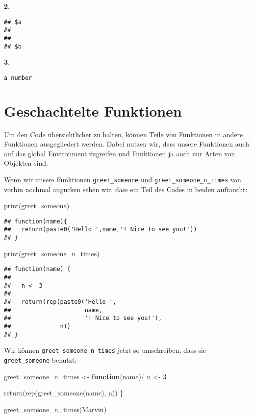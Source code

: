 \documentclass[
]{book}
\newenvironment{Shaded}{\begin{snugshade}}{\end{snugshade}}
\newcommand{\ControlFlowTok}[1]{\textcolor[rgb]{0.13,0.29,0.53}{\textbf{#1}}}
\newcommand{\DecValTok}[1]{\textcolor[rgb]{0.00,0.00,0.81}{#1}}
\newcommand{\FunctionTok}[1]{\textcolor[rgb]{0.00,0.00,0.00}{#1}}
\newcommand{\NormalTok}[1]{#1}
\newcommand{\OtherTok}[1]{\textcolor[rgb]{0.56,0.35,0.01}{#1}}
\newcommand{\StringTok}[1]{\textcolor[rgb]{0.31,0.60,0.02}{#1}}
\begin{document}
\textbf{2.}

\begin{verbatim}
## $a
## 
## 
## $b
\end{verbatim}

\textbf{3.}

\texttt{\textquotesingle{}a\ number\textquotesingle{}}

\hypertarget{geschachtelte-funktionen}{%
\section{Geschachtelte Funktionen}\label{geschachtelte-funktionen}}

Um den Code übersichtlicher zu halten, können Teile von Funktionen in andere Funktionen ausgegliedert werden.
Dabei nutzen wir, dass unsere Funktionen auch auf das global Environment zugreifen und Funktionen ja auch nur Arten von Objekten sind.

Wenn wir unsere Funktionen \texttt{greet\_someone} und \texttt{greet\_someone\_n\_times} von vorhin nochmal angucken sehen wir, dass ein Teil des Codes in beiden auftaucht:

\begin{Shaded}
\begin{Highlighting}[]
\FunctionTok{print}\NormalTok{(greet\_someone)}
\end{Highlighting}
\end{Shaded}

\begin{verbatim}
## function(name){
##   return(paste0('Hello ',name,'! Nice to see you!'))
## }
\end{verbatim}

\begin{Shaded}
\begin{Highlighting}[]
\FunctionTok{print}\NormalTok{(greet\_someone\_n\_times)}
\end{Highlighting}
\end{Shaded}

\begin{verbatim}
## function(name) {
##   
##   n <- 3
##   
##   return(rep(paste0('Hello ', 
##                     name, 
##                     '! Nice to see you!'), 
##              n))
## }
\end{verbatim}

Wir können \texttt{greet\_someone\_n\_times} jetzt so umschreiben, dass sie \texttt{greet\_someone} benutzt:

\begin{Shaded}
\begin{Highlighting}[]
\NormalTok{greet\_someone\_n\_times }\OtherTok{\textless{}{-}} \ControlFlowTok{function}\NormalTok{(name)\{}
\NormalTok{  n }\OtherTok{\textless{}{-}} \DecValTok{3}
  
  \FunctionTok{return}\NormalTok{(}\FunctionTok{rep}\NormalTok{(}\FunctionTok{greet\_someone}\NormalTok{(name), }
\NormalTok{             n))}
\NormalTok{\}}


\FunctionTok{greet\_someone\_n\_times}\NormalTok{(}\StringTok{\textquotesingle{}Marvin\textquotesingle{}}\NormalTok{)}
\end{Highlighting}
\end{Shaded}
\end{document}
